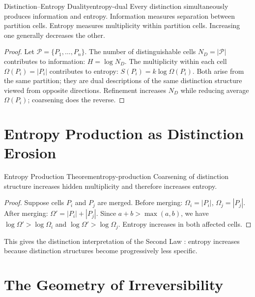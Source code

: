 \documentclass[12pt,twoside,openright]{book}
\newcommand{\partition}{\mathcal{P}}
\begin{document}
\begin{law}{Distinction--Entropy Duality}{entropy-dual}
  Every distinction simultaneously produces information
  and entropy. Information measures separation between
  partition cells. Entropy measures multiplicity within
  partition cells. Increasing one generally decreases the
  other. 
\end{law}

\begin{proof}
  Let $\partition = \{P_1,\ldots,P_n\}$. The number of
  distinguishable cells $N_D = |\partition|$ contributes
  to information: $H = \log N_D$. The multiplicity within
  each cell $\Omega(P_i) = |P_i|$ contributes to entropy:
  $S(P_i) = k\log\Omega(P_i)$. Both arise from the same
  partition; they are dual descriptions of the same
  distinction structure viewed from opposite directions.
  Refinement increases $N_D$ while reducing average
  $\Omega(P_i)$; coarsening does the reverse.
\end{proof}

\section{Entropy Production as Distinction Erosion}
\label{sec:ch3-production}

\begin{theorem}{Entropy Production Theorem}{entropy-production}
  Coarsening of distinction structure increases hidden
  multiplicity and therefore increases entropy.
\end{theorem}

\begin{proof}
  Suppose cells $P_i$ and $P_j$ are merged. Before
  merging: $\Omega_i = |P_i|$, $\Omega_j = |P_j|$.
  After merging: $\Omega' = |P_i| + |P_j|$.
  Since $a + b > \max(a,b)$, we have $\log\Omega' >
  \log\Omega_i$ and $\log\Omega' > \log\Omega_j$.
  Entropy increases in both affected cells.
\end{proof}

This gives the distinction interpretation of the Second
Law \parencite{prigogine1984}: entropy increases because
distinction structures become progressively less specific.

\section{The Geometry of Irreversibility}
\label{sec:ch3-irrev}
\end{document}
